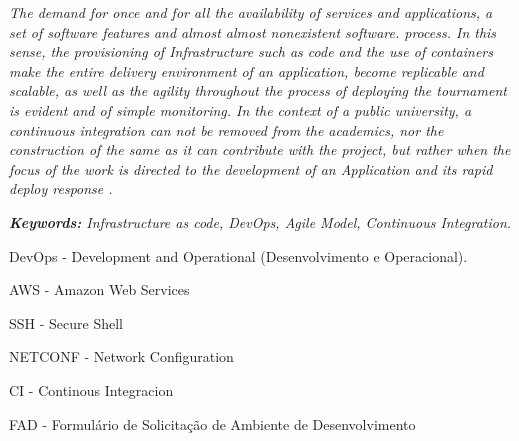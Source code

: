 \newpage
\begin{resumo}
	
\textit{The demand for once and for all the availability of services and applications, a set of software features and almost almost nonexistent software. process. In this sense, the provisioning of Infrastructure such as code and the use of containers make the entire delivery environment of an application, become replicable and scalable, as well as the agility throughout the process of deploying the tournament is evident and of simple monitoring. In the context of a public university, a continuous integration can not be removed from the academics, nor the construction of the same as it can contribute with the project, but rather when the focus of the work is directed to the development of an Application and its rapid deploy response .}

\textit{\textbf{Keywords:} Infrastructure as code, DevOps, Agile Model, Continuous Integration.}

\end{resumo}

\newpage

\listoffigures*

 \newpage
\newpage
\listoftables*
\cleardoublepage

\begin{siglas}
  \item DevOps - Development and Operational (Desenvolvimento e Operacional).
  \item AWS - Amazon Web Services
  \item SSH - Secure Shell
  \item NETCONF - Network Configuration
  \item CI - Continous Integracion
  \item FAD - Formulário de Solicitação de Ambiente de Desenvolvimento
\end{siglas}


\tableofcontents*
\cleardoublepage

